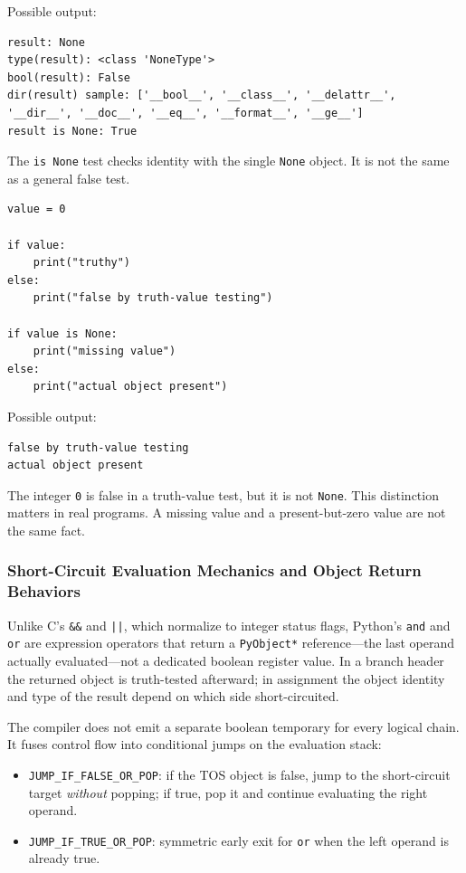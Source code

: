 \documentclass[a4paper,twoside]{report}
\begin{document}
Possible output:

\begin{verbatim}
result: None
type(result): <class 'NoneType'>
bool(result): False
dir(result) sample: ['__bool__', '__class__', '__delattr__', '__dir__', '__doc__', '__eq__', '__format__', '__ge__']
result is None: True
\end{verbatim}

The \texttt{is None} test checks identity with the single \texttt{None} object. It is not the same as a general false test.

\begin{verbatim}
value = 0

if value:
    print("truthy")
else:
    print("false by truth-value testing")

if value is None:
    print("missing value")
else:
    print("actual object present")
\end{verbatim}

Possible output:

\begin{verbatim}
false by truth-value testing
actual object present
\end{verbatim}

The integer \texttt{0} is false in a truth-value test, but it is not \texttt{None}. This distinction matters in real programs. A missing value and a present-but-zero value are not the same fact.

\subsubsection{Short-Circuit Evaluation Mechanics and Object Return Behaviors}

Unlike C's \texttt{\&\&} and \texttt{||}, which normalize to integer status flags, Python's \texttt{and} and \texttt{or} are expression operators that return a \texttt{PyObject*} reference---the last operand actually evaluated---not a dedicated boolean register value. In a branch header the returned object is truth-tested afterward; in assignment the object identity and type of the result depend on which side short-circuited.

The compiler does not emit a separate boolean temporary for every logical chain. It fuses control flow into conditional jumps on the evaluation stack:

\begin{itemize}
    \item \texttt{JUMP\_IF\_FALSE\_OR\_POP}: if the TOS object is false, jump to the short-circuit target \emph{without} popping; if true, pop it and continue evaluating the right operand.
    \item \texttt{JUMP\_IF\_TRUE\_OR\_POP}: symmetric early exit for \texttt{or} when the left operand is already true.
\end{itemize}
\end{document}
